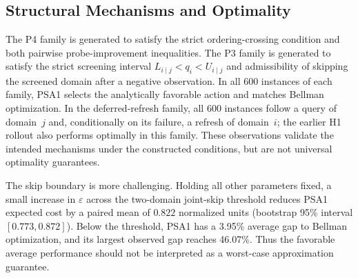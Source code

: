 \documentclass[conference]{IEEEtran}
\begin{document}
\subsection{Structural Mechanisms and Optimality}
\begin{table}[t]
\caption{PSA1 cost savings relative to query-only and optimal
no-refresh policies, and mean gap to Bellman optimum.}
\label{tab:synthetic_families}
\centering
{}
\end{table}
The P4 family is generated to satisfy the strict ordering-crossing
condition and both pairwise probe-improvement inequalities. The P3
family is generated to satisfy the strict screening interval
$L_{i\mid j}<q_i<U_{i\mid j}$ and admissibility of skipping the
screened domain after a negative observation. In all 600 instances of
each family, PSA1 selects the analytically favorable action and
matches Bellman optimization. In the deferred-refresh family, all
600 instances follow a query of domain~$j$ and, conditionally on its
failure, a refresh of domain~$i$; the earlier H1 rollout also performs
optimally in this family. These observations validate the intended
mechanisms under the constructed conditions, but are not universal
optimality guarantees.

The skip boundary is more challenging. Holding all other parameters
fixed, a small increase in $\varepsilon$ across the two-domain
joint-skip threshold reduces PSA1 expected cost by a paired mean of
$0.822$ normalized units (bootstrap 95\% interval
$[0.773,0.872]$). Below the threshold, PSA1 has a 3.95\% average
gap to Bellman optimization, and its largest observed gap reaches
46.07\%. Thus the favorable average performance should not be
interpreted as a worst-case approximation guarantee.
\end{document}
